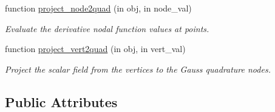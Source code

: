 \begin{DoxyCompactItemize}
function \hyperlink{class_std_cell_a2bfe27e9231a19e50b70d22c3b0d85bc}{project\+\_\+node2quad} (in obj, in node\+\_\+val)
\begin{DoxyCompactList}\small\item\em Evaluate the derivative nodal function values at points. \end{DoxyCompactList}\item 
function \hyperlink{class_std_cell_ae88829dd3d3390a4b1188186ec3dfb7b}{project\+\_\+vert2quad} (in obj, in vert\+\_\+val)
\begin{DoxyCompactList}\small\item\em Project the scalar field from the vertices to the Gauss quadrature nodes. \end{DoxyCompactList}\end{DoxyCompactItemize}
\subsection*{Public Attributes}
